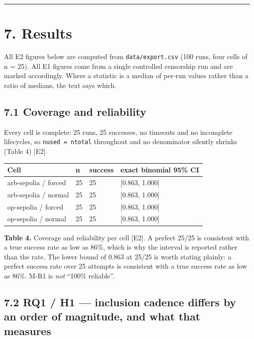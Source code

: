 \documentclass[conference]{IEEEtran}
\renewcommand{\_}{\textunderscore\allowbreak}
\begin{document}
\begin{center}\rule{0.5\linewidth}{0.5pt}\end{center}

\section{7. Results}\label{results}

All E2 figures below are computed from \texttt{data/export.csv} (100
runs, four cells of n = 25). All E1 figures come from a single
controlled censorship run and are marked accordingly. Where a statistic
is a median of per-run values rather than a ratio of medians, the text
says which.

\subsection{7.1 Coverage and
reliability}\label{coverage-and-reliability}

Every cell is complete: 25 runs, 25 successes, no timeouts and no
incomplete lifecycles, so \texttt{n\_used\ =\ n\_total} throughout and
no denominator silently shrinks (Table 4) {[}E2{]}.

\begin{table}[!t]
\centering
\small
\begin{tabular}{@{}llll@{}}
\toprule
Cell & n & success & exact binomial 95\% CI \\
\midrule
arb-sepolia / forced & 25 & 25 & {[}0.863, 1.000{]} \\
arb-sepolia / normal & 25 & 25 & {[}0.863, 1.000{]} \\
op-sepolia / forced & 25 & 25 & {[}0.863, 1.000{]} \\
op-sepolia / normal & 25 & 25 & {[}0.863, 1.000{]} \\
\bottomrule
\end{tabular}
\par\vspace{5pt}
{\footnotesize\raggedright \textbf{Table 4.} Coverage and reliability per cell {[}E2{]}. A perfect
25/25 is consistent with a true success rate as low as 86\%, which is
why the interval is reported rather than the rate. The lower bound of
0.863 at 25/25 is worth stating plainly: a perfect success rate over 25
attempts is consistent with a true success rate as low as 86\%. M-R1 is
\emph{not} ``100\% reliable''.\par}
\end{table}

\subsection{7.2 RQ1 / H1 --- inclusion cadence differs by an order of
magnitude, and what that
measures}\label{rq1-h1-inclusion-cadence-differs-by-an-order-of-magnitude-and-what-that-measures}
\end{document}
